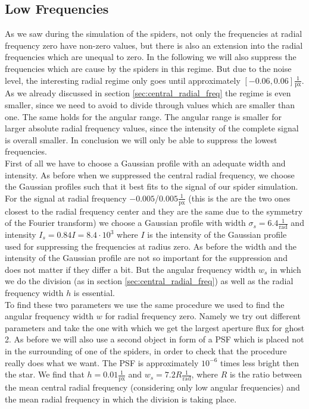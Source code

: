 \subsection{Low Frequencies}
As we saw during the simulation of the spiders, not only the frequencies at radial frequency zero have non-zero values, but there is also an extension into the radial frequencies which are unequal to zero. In the following we will also suppress the frequencies which are cause by the spiders in this regime. But due to the noise level, the interesting radial regime only goes until approximately $[-0.06, 0.06] \frac{1}{\mathrm{px}}$. As we already discussed in section \ref{sec:central_radial_freq} the regime is even smaller, since we need to avoid to divide through values which are smaller than one. The same holds for the angular range. The angular range is smaller for larger absolute radial frequency values, since the intensity of the complete signal is overall smaller. In conclusion we will only be able to suppress the lowest frequencies.\\
First of all we have to choose a Gaussian profile with an adequate width and intensity. As before when we suppressed the central radial frequency, we choose the Gaussian profiles such that it best fits to the signal of our spider simulation. For the signal at radial frequency $-0.005$/$0.005 \frac{1}{\mathrm{px}}$ (this is the are the two ones closest to the radial frequency center and they are the same due to the symmetry of the Fourier transform) we choose a Gaussian profile with width $\sigma_s = 6.4 \frac{1}{\mathrm{rad}}$ and intensity $I_s = 0.84 I = 8.4 \cdot 10^3$ where $I$ is the intensity of the Gaussian profile used for suppressing the frequencies at radius zero. As before the width and the intensity of the Gaussian profile are not so important for the suppression and does not matter if they differ a bit. But the angular frequency width $w_s$ in which we do the division (as in section \ref{sec:central_radial_freq}) as well as the radial frequency width $h$ is essential.\\
To find these two parameters we use the same procedure we used to find the angular frequency width $w$ for radial frequency zero. Namely we try out different parameters and take the one with which we get the largest aperture flux for ghost 2. As before we will also use a second object in form of a PSF which is placed not in the surrounding of one of the spiders, in order to check that the procedure really does what we want. The PSF is approximately $10^{-6}$ times less bright then the star. We find that $h = 0.01 \frac{1}{\mathrm{px}}$ and $w_s = 7.2 R \frac{1}{\mathrm{rad}}$, where $R$ is the ratio between the mean central radial frequency (considering only low angular frequencies) and the mean radial frequency in which the division is taking place.\\
